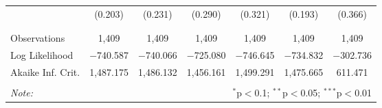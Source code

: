 \begin{tabular}{@{\extracolsep{5pt}}lcccccc}
  & (0.203) & (0.231) & (0.290) & (0.321) & (0.193) & (0.366) \\
  & & & & & & \\
\hline \\[-1.8ex]
Observations & 1,409 & 1,409 & 1,409 & 1,409 & 1,409 & 1,409 \\
Log Likelihood & $-$740.587 & $-$740.066 & $-$725.080 & $-$746.645 & $-$734.832 & $-$302.736 \\
Akaike Inf. Crit. & 1,487.175 & 1,486.132 & 1,456.161 & 1,499.291 & 1,475.665 & 611.471 \\
\hline
\hline \\[-1.8ex]
\textit{Note:}  & \multicolumn{6}{r}{$^{*}$p$<$0.1; $^{**}$p$<$0.05; $^{***}$p$<$0.01} \\
\end{tabular}

